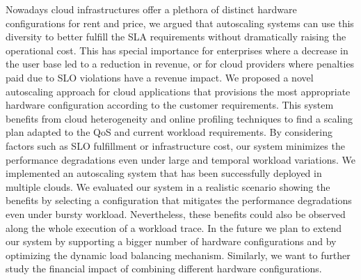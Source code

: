 \label{sec:conclusion}



Nowadays cloud infrastructures offer a plethora of distinct hardware configurations for rent and price, we argued that autoscaling systems can use this diversity to better fulfill the SLA requirements without dramatically raising the operational cost. This has special importance for enterprises where a decrease in the user base led to a reduction in revenue, or for cloud providers where penalties paid due to SLO violations have a revenue impact. We proposed a novel autoscaling approach for cloud applications that provisions the most appropriate hardware configuration according to the customer requirements. This system benefits from cloud heterogeneity and online profiling techniques to find a scaling plan adapted to the QoS and current workload requirements. By considering factors such as SLO fulfillment or infrastructure cost, our system minimizes the performance degradations even under large and temporal workload variations. We implemented an autoscaling system that has been successfully deployed in multiple clouds. We evaluated our system in a realistic scenario showing the benefits by selecting a configuration that mitigates the performance degradations even under bursty workload. Nevertheless, these benefits could also be observed along the whole execution of a workload trace. In the future we plan to extend our system by supporting a bigger number of hardware configurations and by optimizing 
the dynamic load balancing mechanism. Similarly, we want to further study the financial impact of combining different hardware configurations.









